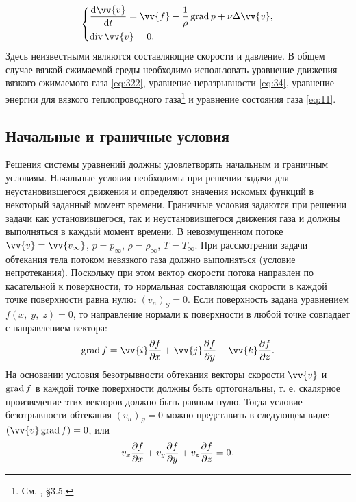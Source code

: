 	\begin{gather}
		\begin{dcases}\label{eq:336}
			\frac{\dd\vv{v}}{\dd t} = \vv{f} - \frac{1}{\rho}\grad p + \nu\Delta\vv{v},\\
			\diverg\vv{v} = 0.
		\end{dcases}
	\end{gather}
	Здесь неизвестными являются составляющие скорости и давление.\n
	В общем случае вязкой сжимаемой среды необходимо использовать уравнение движения вязкого сжимаемого газа \eqref{eq:322}, уравнение неразрывности \eqref{eq:34}, уравнение энергии для вязкого теплопроводного газа\footnote{См. \cite{2}, \S3.5.} и уравнение состояния газа \eqref{eq:11}.
	
	\subsection{Начальные и граничные условия}
	Решения системы уравнений должны удовлетворять начальным и граничным условиям. Начальные условия необходимы при решении задачи для неустановившегося движения и определяют значения искомых функций в некоторый заданный момент времени.\n
	Граничные условия задаются при решении задачи как установившегося, так и неустановившегося движения газа и должны выполняться в каждый момент времени. В невозмущенном потоке $\vv{v} = \vv{v_\infty}$, $p = p_\infty$, $\rho = \rho_\infty$, $T = T_\infty$.\n
	При рассмотрении задачи обтекания тела потоком невязкого газа должно выполняться  (условие непротекания). Поскольку при этом вектор скорости потока направлен по касательной к поверхности, то нормальная составляющая скорости в каждой точке поверхности равна нулю: $\left(v_n\right)_S = 0$. Если поверхность задана уравнением $f\left(x,\; y,\; z\right) = 0$, то направление нормали к поверхности в любой точке совпадает с направлением вектора:
	\begin{gather*}
		\grad f = \vv{i}\frac{\pp f}{\pp x} + \vv{j}\frac{\pp f}{\pp y} + \vv{k}\frac{\pp f}{\pp z}.
	\end{gather*}
	На основании условия безотрывности обтекания векторы скорости $\vv{v}$ и $\operatorname{grad} f$ в каждой точке поверхности должны быть ортогональны, т. е. скалярное произведение этих векторов должно быть равным нулю. Тогда условие безотрывности обтекания $\left(v_n\right)_S = 0$ можно представить в следующем виде: $\left(\vv{v}\grad f\right) = 0$, или
	\begin{gather}
		v_x\frac{\partial f}{\partial x} + v_y\frac{\partial f}{\partial y} + v_z\frac{\partial f}{\partial z} = 0.\label{eq:337}
	\end{gather}\n
